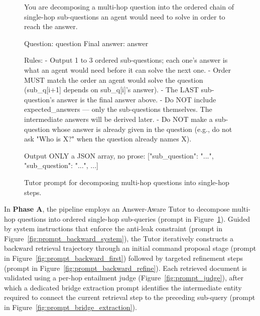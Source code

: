 \documentclass{llmxive}
\begin{document}


\begin{figure}[!b]
\begin{promptbox}[Decomposition]
You are decomposing a multi-hop question into the ordered chain of single-hop sub-questions an agent would need to solve in order to reach the answer.

Question: {question}
Final answer: {answer}

Rules:
- Output 1 to 3 ordered sub-questions; each one's answer is what an agent would need before it can solve the next one.
- Order MUST match the order an agent would solve the question (sub_q[i+1] depends on sub_q[i]'s answer).
- The LAST sub-question's answer is the final answer above.
- Do NOT include expected_answers — only the sub-questions themselves. The intermediate answers will be derived later.
- Do NOT make a sub-question whose answer is already given in the question (e.g., do not ask "Who is X?" when the question already names X).

Output ONLY a JSON array, no prose:
[{{"sub_question": "..."}}, {{"sub_question": "..."}}, ...]
\end{promptbox}
\vspace{-0.4cm}
\caption{Tutor prompt for decomposing multi-hop questions into single-hop steps.}
\label{fig:prompt_decomposition}
\end{figure}

In \textbf{Phase A}, the pipeline employs an Answer-Aware Tutor to decompose multi-hop questions into ordered single-hop sub-queries (prompt in Figure~\ref{fig:prompt_decomposition}). Guided by system instructions that enforce the anti-leak constraint (prompt in Figure~\ref{fig:prompt_backward_system}), the Tutor iteratively constructs a backward retrieval trajectory through an initial command proposal stage (prompt in Figure~\ref{fig:prompt_backward_first}) followed by targeted refinement steps (prompt in Figure~\ref{fig:prompt_backward_refine}). Each retrieved document is validated using a per-hop entailment judge (Figure~\ref{fig:prompt_judge}), after which a dedicated bridge extraction prompt identifies the intermediate entity required to connect the current retrieval step to the preceding sub-query (prompt in Figure~\ref{fig:prompt_bridge_extraction}).
\end{document}

